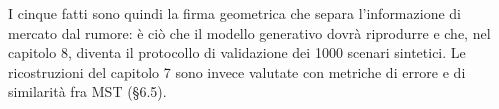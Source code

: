 I cinque fatti sono quindi la firma geometrica che separa l'informazione di mercato dal rumore: è ciò che il modello generativo dovrà riprodurre e che, nel capitolo 8, diventa il protocollo di validazione dei 1000 scenari sintetici. Le ricostruzioni del capitolo 7 sono invece valutate con metriche di errore e di similarità fra MST (\S6.5).
